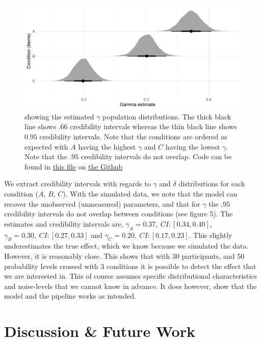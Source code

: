 \documentclass[12pt]{article}
\begin{document}
\begin{figure}[H]
	\includegraphics[width = \linewidth]{../Figures/gamma.png}
	\caption{showing the estimated  $\gamma$
	population distributions. The thick
	black line shows  $.66$ credibility intervals
	whereas the thin black line shows  $0.95$
	credibility intervals. Note that the
	conditions are ordered as expected with
	 $A$ having the highest  $\gamma$ and
	 $C$ having the lowest  $\gamma$.
	 Note that the  $.95$ credibility
	 intervals do not overlap. Code can
 be found in
 \href{https://github.com/victor-m-p/BayesianDecisionWeights/blob/main/Code/4_testing_hypotheses.Rmd}{this
 file} on \href{https://github.com/victor-m-p/BayesianDecisionWeights}{the
 Github}}
 \end{figure}

We extract credibility intervals with regards
to $\gamma$ and $\delta$ distributions for each
condition ($A$, $B$, $C$). With the simulated
data, we note that the model can recover
the unobserved (unmeasured) parameters,
and that for $\gamma$ the  $.95$ credibility
intervals do not overlap between conditions
(see figure 5). The estimates and credibility intervals
are, $\gamma_{A} = 0.37, \: CI: [0.34, 0.40]$,
$\gamma_{B} = 0.30, \: CI: [0.27, 0.33]$ and
$\gamma_{C} = 0.20, \: CI: [0.17, 0.23]$.
This slightly underestimates the true effect, which
we know because we simulated the data. However, it
is reasonably close. This shows that with $30$
participants, and 50 probability levels crossed with
3 conditions it is possible to detect the effect
that we are interested in. This of course assumes specific
distributional characteristics and noise-levels
that we cannot know in advance. It does however, show
that the model and the pipeline works as intended.

\section{Discussion \& Future Work}
\end{document}
